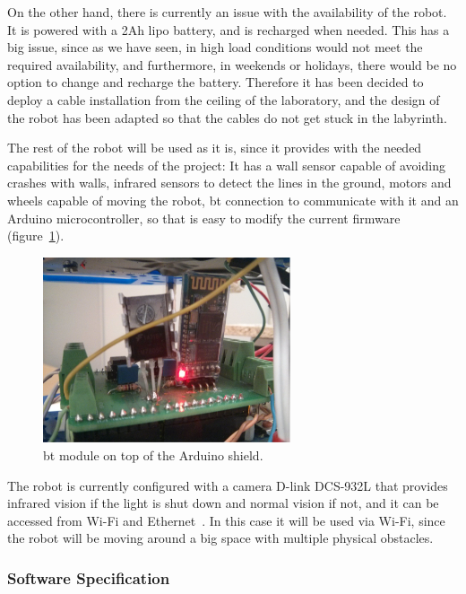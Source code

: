 On the other hand, there is currently an issue with the availability of the robot. It is powered
with a 2Ah \acrshort{lipo} battery, and is recharged when needed. This has a big issue, since as we
have seen, in high load conditions would not meet the required availability, and furthermore, in
weekends or holidays, there would be no option to change and recharge the battery. Therefore it has
been decided to deploy a cable installation from the ceiling of the laboratory, and the design of
the robot has been adapted so that the cables do not get stuck in the labyrinth.

The rest of the robot will be used as it is, since it provides with the needed capabilities for the
needs of the project: It has a wall sensor capable of avoiding crashes with walls, infrared sensors
to detect the lines in the ground, motors and wheels capable of moving the robot, \acrlong{bt}
connection to communicate with it and an Arduino microcontroller, so that is easy to modify the
current firmware (figure~\ref{fig:bluetooth}).

\begin{figure}[!htbp]
	\centering
	\includegraphics[width=0.65\textwidth]{fig/bluetooth.jpg}
	\caption{\acrlong{bt} module on top of the Arduino shield.}
	\label{fig:bluetooth}
\end{figure}

The robot is currently configured with a camera D-link DCS-932L that provides infrared vision if the
light is shut down and normal vision if not, and it can be accessed from Wi-Fi and
Ethernet~\cite{camera}. In this case it will be used via Wi-Fi, since the robot will be moving
around a big space with multiple physical obstacles.

\subsubsection{Software Specification}

